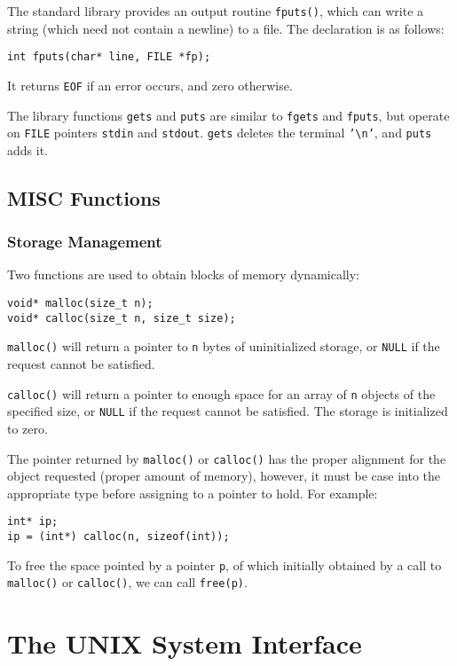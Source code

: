 \documentclass[12pt]{article}
\begin{document}
The standard library provides an output routine \texttt{fputs()}, which can write a string (which need not contain a newline) to a file. The declaration is as follows:
\begin{verbatim}
int fputs(char* line, FILE *fp);
\end{verbatim}
It returns \texttt{EOF} if an error occurs, and zero otherwise.

The library functions \texttt{gets} and \texttt{puts} are similar to \texttt{fgets} and \texttt{fputs}, but operate on \texttt{FILE} pointers \texttt{stdin} and \texttt{stdout}. \texttt{gets} deletes the terminal \texttt{'\textbackslash{}n'}, and \texttt{puts} adds it.
\subsection{MISC Functions}
\label{sec:org002ebf8}
\subsubsection{Storage Management}
\label{sec:org70a8e97}
Two functions are used to obtain blocks of memory dynamically:
\begin{verbatim}
void* malloc(size_t n);
void* calloc(size_t n, size_t size);
\end{verbatim}

\texttt{malloc()} will return a pointer to \texttt{n} bytes of uninitialized storage, or \texttt{NULL} if the request cannot be satisfied.

\texttt{calloc()} will return a pointer to enough space for an array of \texttt{n} objects of the specified size, or \texttt{NULL} if the request cannot be satisfied. The storage is initialized to zero.

The pointer returned by \texttt{malloc()} or \texttt{calloc()} has the proper alignment for the object requested (proper amount of memory), however, it must be case into the appropriate type before assigning to a pointer to hold. For example:
\begin{verbatim}
int* ip;
ip = (int*) calloc(n, sizeof(int));
\end{verbatim}

To free the space pointed by a pointer \texttt{p}, of which initially obtained by a call to \texttt{malloc()} or \texttt{calloc()}, we can call \texttt{free(p)}.
\section{The UNIX System Interface}
\label{sec:org59ca7f3}
\end{document}
